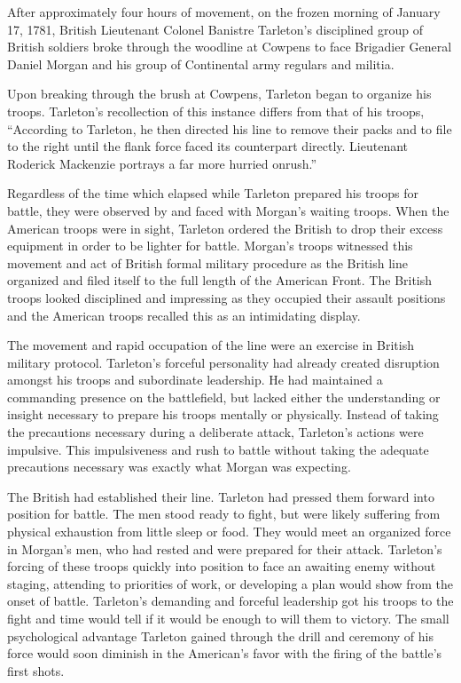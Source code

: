 After approximately four hours of movement, on the frozen morning of January 17,
1781, British Lieutenant Colonel Banistre Tarleton's disciplined group of
British soldiers broke through the woodline at Cowpens to face Brigadier
General Daniel Morgan and his group of Continental army regulars and militia.

Upon breaking through the brush at Cowpens, Tarleton began to organize his
troops. Tarleton's recollection of this instance differs from that of his
troops, ``According to Tarleton, he then directed his line to remove their packs
and to file to the right until the flank force faced its counterpart directly.
Lieutenant Roderick Mackenzie portrays a far more hurried onrush.''
\cite[51]{moncure_cowpens_1996}

Regardless of the time which elapsed while Tarleton prepared his troops for
battle, they were observed by and faced with Morgan's waiting troops. When the
American troops were in sight, Tarleton ordered the British to drop their
excess equipment in order to be lighter for battle. Morgan's troops witnessed
this movement and act of British formal military procedure as the British line
organized and filed itself to the full length of the American Front. The
British troops looked disciplined and impressing as they occupied their assault
positions and the American troops recalled this as an intimidating display.

The movement and rapid occupation of the line were an exercise in British
military protocol. Tarleton's forceful personality had already created
disruption amongst his troops and subordinate leadership. He had maintained a
commanding presence on the battlefield, but lacked either the understanding or
insight necessary to prepare his troops mentally or physically. Instead of
taking the precautions necessary during a deliberate attack, Tarleton's actions
were impulsive. This impulsiveness and rush to battle without taking the
adequate precautions necessary was exactly what Morgan was expecting.

The British had established their line. Tarleton had pressed them forward into
position for battle. The men stood ready to fight, but were likely suffering
from physical exhaustion from little sleep or food. They would meet an
organized force in Morgan's men, who had rested and were prepared for their
attack. Tarleton's forcing of these troops quickly into position to face an
awaiting enemy without staging, attending to priorities of work, or developing
a plan would show from the onset of battle. Tarleton's demanding and forceful
leadership got his troops to the fight and time would tell if it would be
enough to will them to victory. The small psychological advantage Tarleton
gained through the drill and ceremony of his force would soon diminish in the
American's favor with the firing of the battle's first shots.


